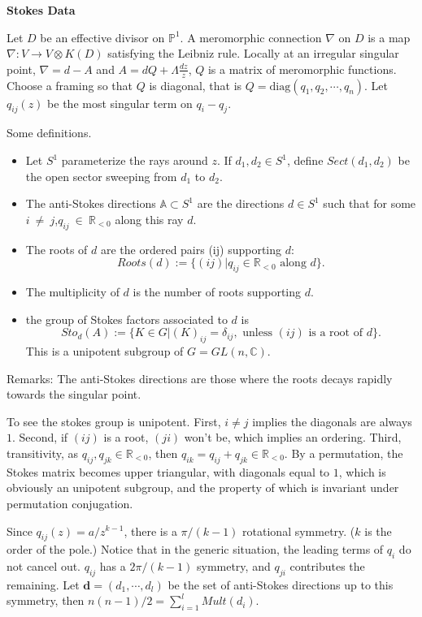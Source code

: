\documentclass[oneside,english]{amsbook}
\numberwithin{section}{chapter}
\numberwithin{equation}{section}
\numberwithin{figure}{section}
\theoremstyle{plain}
\theoremstyle{definition}
\theoremstyle{remark}
\theoremstyle{definition}
\theoremstyle{definition}
\theoremstyle{plain}
\begin{document}
\medskip
\textbf{Stokes Data}

Let $D$ be an effective divisor on $\mathbb{P}^1$. A meromorphic connection $\nabla$ on $D$ is a map $\nabla: V\rightarrow V\otimes K(D)$ satisfying the Leibniz rule. Locally at an irregular singular point, $\nabla = d - A$ and $A = dQ + \Lambda \frac{dz}{z}$, $Q$ is a matrix of meromorphic functions. Choose a framing so that $Q$ is diagonal, that is $Q = \text{diag}(q_1,q_2,\dotsb, q_n)$. Let $q_{ij}(z)$ be the most singular term on $q_i - q_j$.

Some definitions.
\begin{itemize}
  \item Let $S^1$ parameterize the rays around $z$. If $d_1,d_2\in S^1$, define $Sect(d_1,d_2)$ be the open sector sweeping from $d_1$ to $d_2$.
  \item The anti-Stokes directions $\mathbb{A} \subset S^1$ are the directions $d\in S^1$ such that for some $i~\neq~j$,$q_{ij}~\in~\mathbb{R}_{<0}$ along this ray $d$.
  \item The roots of $d$ are the ordered pairs (ij) supporting $d$:
  $$Roots(d) := \{(ij)| q_{ij}\in \mathbb{R}_{<0} \text{ along } d\}.$$
  \item The multiplicity of $d$ is the number of roots supporting $d$.
  \item the group of Stokes factors associated to $d$ is
  $$Sto_d(A) := \{K\in G |(K)_{ij} = \delta_{ij}, \text{ unless }(ij) \text{ is a root of } d\}.$$
  This is a unipotent subgroup of $G = GL(n,\mathbb{C})$.
\end{itemize}

Remarks: The anti-Stokes directions are those where the roots decays rapidly towards the singular point.

To see the stokes group is unipotent. First, $i\neq j$ implies the diagonals are always $1$. Second, if $(ij)$ is a root, $(ji)$ won't be, which implies an ordering. Third, transitivity, as $q_{ij}, q_{jk}\in \mathbb{R}_{<0}$, then $q_{ik} = q_{ij} + q_{jk}\in \mathbb{R}_{<0}$. By a permutation, the Stokes matrix becomes upper triangular, with diagonals equal to $1$, which is obviously an unipotent subgroup, and the property of which is invariant under permutation conjugation.

Since $q_{ij}(z) = a/z^{k-1}$, there is a $\pi /(k-1)$ rotational symmetry. ($k$ is the order of the pole.) Notice that in the generic situation, the leading terms of $q_i$ do not cancel out. $q_{ij}$ has a $2\pi /(k-1)$ symmetry, and $q_{ji}$ contributes the remaining. Let $\textbf{d}=(d_1,\dotsb,d_l)$ be the set of anti-Stokes directions up to this symmetry, then $n(n-1)/2 = \sum_{i=1}^l Mult(d_i)$.
\end{document}
